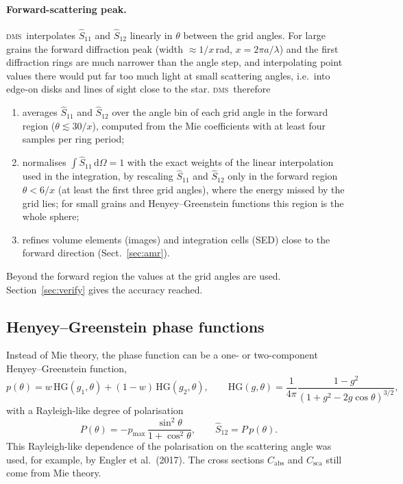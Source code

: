 \documentclass[11pt,a4paper]{article}
\newcommand{\dms}{\textsc{dms}}
\newcommand{\dd}{\mathrm{d}}
\begin{document}
\paragraph{Forward-scattering peak.} \dms\ interpolates $\hat S_{11}$ and $\hat S_{12}$ linearly
in $\theta$ between the grid angles. For large grains the forward diffraction peak (width
$\approx1/x$\,rad, $x=2\pi a/\lambda$) and the first diffraction rings are much narrower than the
angle step, and interpolating point values there would put far too much light at small
scattering angles, i.e.\ into edge-on disks and lines of sight close to the star. \dms\ therefore
\begin{enumerate}
\item averages $\hat S_{11}$ and $\hat S_{12}$ over the angle bin of each grid angle in the forward
      region ($\theta\lesssim30/x$), computed from the Mie coefficients with at least four samples
      per ring period;
\item normalises $\int\hat S_{11}\,\dd\Omega=1$ with the exact weights of the linear interpolation
      used in the integration, by rescaling $\hat S_{11}$ and $\hat S_{12}$ only in the forward
      region $\theta<6/x$ (at least the first three grid angles), where the energy missed by the grid
      lies; for small grains and Henyey--Greenstein functions this region is the whole sphere;
\item refines volume elements (images) and integration cells (SED) close to the forward direction
      (Sect.~\ref{sec:amr}).
\end{enumerate}
Beyond the forward region the values at the grid angles are used. Section~\ref{sec:verify} gives
the accuracy reached.

\subsection{Henyey--Greenstein phase functions}

Instead of Mie theory, the phase function can be a one- or two-component Henyey--Greenstein
function,
\begin{equation}
p(\theta) = w\,\mathrm{HG}(g_1,\theta) + (1-w)\,\mathrm{HG}(g_2,\theta),\qquad
\mathrm{HG}(g,\theta) = \frac{1}{4\pi}\frac{1-g^2}{(1+g^2-2g\cos\theta)^{3/2}},
\end{equation}
with a Rayleigh-like degree of polarisation
\begin{equation}
P(\theta) = -p_\mathrm{max}\,\frac{\sin^2\theta}{1+\cos^2\theta},\qquad
\hat S_{12} = P\,p(\theta).
\end{equation}
This Rayleigh-like dependence of the polarisation on the scattering angle was used, for example,
by Engler et al.\ (2017). The cross sections $C_\mathrm{abs}$ and $C_\mathrm{sca}$ still come from
Mie theory.
\end{document}

